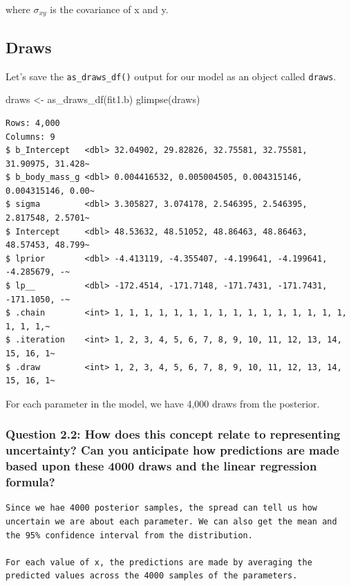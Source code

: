 \documentclass[
  letterpaper,
  DIV=11,
  numbers=noendperiod]{scrartcl}
\newenvironment{Shaded}{\begin{snugshade}}{\end{snugshade}}
\newcommand{\FunctionTok}[1]{\textcolor[rgb]{0.28,0.35,0.67}{#1}}
\newcommand{\NormalTok}[1]{\textcolor[rgb]{0.00,0.23,0.31}{#1}}
\newcommand{\OtherTok}[1]{\textcolor[rgb]{0.00,0.23,0.31}{#1}}
\begin{document}
where \(\sigma_{xy}\) is the covariance of x and y.

\subsection{Draws}\label{draws}

Let's save the \texttt{as\_draws\_df()} output for our model as an
object called \texttt{draws}.

\begin{Shaded}
\begin{Highlighting}[]
\NormalTok{draws }\OtherTok{\textless{}{-}} \FunctionTok{as\_draws\_df}\NormalTok{(fit1.b)}
\FunctionTok{glimpse}\NormalTok{(draws)}
\end{Highlighting}
\end{Shaded}

\begin{verbatim}
Rows: 4,000
Columns: 9
$ b_Intercept   <dbl> 32.04902, 29.82826, 32.75581, 32.75581, 31.90975, 31.428~
$ b_body_mass_g <dbl> 0.004416532, 0.005004505, 0.004315146, 0.004315146, 0.00~
$ sigma         <dbl> 3.305827, 3.074178, 2.546395, 2.546395, 2.817548, 2.5701~
$ Intercept     <dbl> 48.53632, 48.51052, 48.86463, 48.86463, 48.57453, 48.799~
$ lprior        <dbl> -4.413119, -4.355407, -4.199641, -4.199641, -4.285679, -~
$ lp__          <dbl> -172.4514, -171.7148, -171.7431, -171.7431, -171.1050, -~
$ .chain        <int> 1, 1, 1, 1, 1, 1, 1, 1, 1, 1, 1, 1, 1, 1, 1, 1, 1, 1, 1,~
$ .iteration    <int> 1, 2, 3, 4, 5, 6, 7, 8, 9, 10, 11, 12, 13, 14, 15, 16, 1~
$ .draw         <int> 1, 2, 3, 4, 5, 6, 7, 8, 9, 10, 11, 12, 13, 14, 15, 16, 1~
\end{verbatim}

For each parameter in the model, we have 4,000 draws from the posterior.

\subsubsection{Question 2.2: How does this concept relate to
representing uncertainty? Can you anticipate how predictions are made
based upon these 4000 draws and the linear regression
formula?}\label{question-2.2-how-does-this-concept-relate-to-representing-uncertainty-can-you-anticipate-how-predictions-are-made-based-upon-these-4000-draws-and-the-linear-regression-formula}

\begin{verbatim}
Since we hae 4000 posterior samples, the spread can tell us how uncertain we are about each parameter. We can also get the mean and the 95% confidence interval from the distribution.

For each value of x, the predictions are made by averaging the predicted values across the 4000 samples of the parameters.
\end{verbatim}
\end{document}
